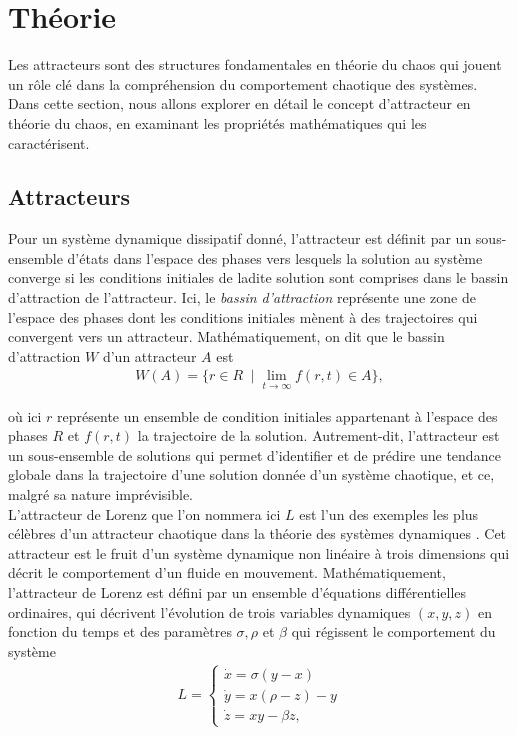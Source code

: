 \section{Théorie} \label{sec: theory}
    Les attracteurs sont des structures fondamentales en théorie du chaos qui
    jouent un rôle clé dans la compréhension du comportement chaotique des
    systèmes. Dans cette section, nous allons explorer en détail le concept
    d'attracteur en théorie du chaos, en examinant les propriétés mathématiques
    qui les caractérisent.

\subsection{Attracteurs} \label{subsec: attractors}
    Pour un système dynamique dissipatif donné, l'attracteur est définit par
    un sous-ensemble d'états dans l'espace des phases vers lesquels la
    solution au système converge si les conditions initiales de ladite solution
    sont comprises dans le bassin d'attraction de l'attracteur. Ici, le
    \textit{bassin d'attraction} représente une zone de l'espace des phases
    dont les conditions initiales mènent à des trajectoires qui convergent vers
    un attracteur. Mathématiquement, on dit que le bassin d'attraction $W$
    d'un attracteur $A$ est
    \begin{align}
        W(A) = \{r\in R\;\;|\;\lim_{t\to\infty} f(r, t)\in A\},
    \end{align}

    où ici $r$ représente un ensemble de condition initiales appartenant à
    l'espace des phases $R$ et $f(r, t)$ la trajectoire de la solution.
    Autrement-dit, l'attracteur est un sous-ensemble de solutions qui permet
    d'identifier et de prédire une tendance globale dans la trajectoire d'une
    solution donnée d'un système chaotique, et ce, malgré sa nature
    imprévisible. \\

    L'attracteur de Lorenz que l'on nommera ici $L$ est l'un des exemples les
    plus célèbres d'un attracteur chaotique dans la théorie des systèmes
    dynamiques \cite{lorenz}. Cet attracteur est le fruit d'un système
    dynamique non linéaire à trois dimensions qui décrit le comportement d'un
    fluide en mouvement. Mathématiquement, l'attracteur de Lorenz est défini
    par un ensemble d'équations différentielles ordinaires, qui décrivent
    l'évolution de trois variables dynamiques $(x, y, z)$ en fonction du temps
    et des paramètres $\sigma, \rho$ et $\beta$ qui régissent le comportement
    du système
    \begin{align}
        L = \left\{
        \begin{array}{c}
           \Dot{x} = \sigma(y - x) \\
           \Dot{y} = x(\rho - z) - y \\
           \Dot{z} = xy - \beta z,
        \end{array}
        \right.
        \label{eq : lorenz}
    \end{align}

